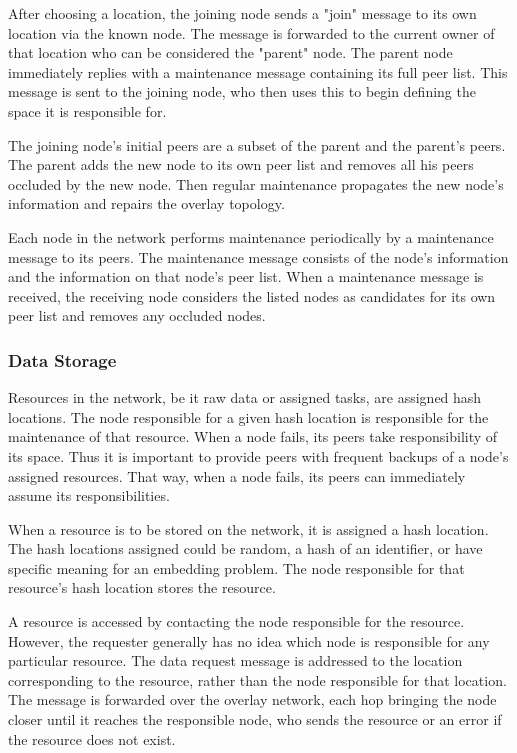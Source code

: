 \documentclass{article}
\begin{document}
After choosing a location, the joining node sends a "join" message to its own location via the known node.
The message is forwarded to the current owner of that location who can be considered the "parent" node.
The parent node immediately replies with a maintenance message containing its full peer list. This message is sent to the joining node, who then uses this to begin defining the space it is responsible for. 

The joining node's initial peers are a subset of the parent and the parent's peers. The parent adds the new node to its own peer list and removes all his peers occluded by the new node.  Then regular maintenance propagates the new node's information and repairs the overlay topology. 


Each node in the network performs maintenance periodically by a maintenance message to its peers. The maintenance message consists of the node's information and the information on that node's peer list. When a maintenance message is received, the receiving node considers the listed nodes as candidates for its own peer list and removes any occluded nodes. 


\subsubsection*{Data Storage}
Resources in the network, be it raw data or assigned tasks, are assigned hash locations. The node responsible for a given hash location is responsible for the maintenance of that resource. When a node fails, its peers take responsibility of its space. Thus it is important to provide peers with frequent backups of a node's assigned resources.  That way, when a node fails, its peers can immediately assume its responsibilities.

When a resource is to be stored on the network, it is assigned a hash location. The hash locations assigned could be random, a hash of an identifier, or have specific meaning for an embedding problem. The node responsible for that resource's hash location stores the resource.

A resource is accessed by contacting the node responsible for the resource.  However, the requester generally has no idea which node is responsible for any particular resource.  The data request message is addressed to the location corresponding to the resource, rather than the node responsible for that location.  The message is forwarded over the overlay network, each hop bringing the node closer until it reaches the responsible node, who sends the resource or an error if the resource does not exist.
\end{document}
